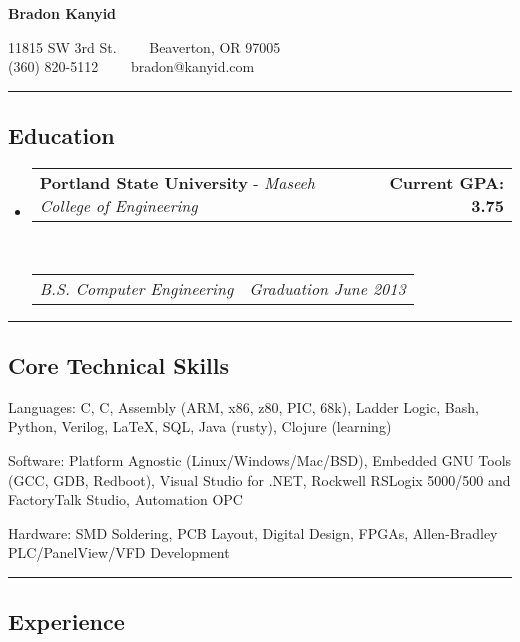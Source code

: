 \documentclass[10pt,letterpaper]{article}
\makeatletter
\newenvironment{indentsection}[1]%
{\begin{list}{}%
	{\setlength{\leftmargin}{#1}}%
	\item[]%
}
{\end{list}}
\newcommand{\headerrow}[2]
{\begin{tabular*}{\linewidth}{l@{\extracolsep{\fill}}r}
	#1 &
	#2 \\
\end{tabular*}}
\newcommand{\CPP}
{C\nolinebreak[4]\hspace{-.05em}\raisebox{.22ex}{\footnotesize\bf ++}}
\makeatother
\begin{document}
\begin{center}
{\LARGE \textbf{Bradon Kanyid}}

11815 SW 3rd St.\ \ \textbullet
\ \ Beaverton, OR 97005
\\
(360) 820-5112\ \ \textbullet
\ \ bradon@kanyid.com
\end{center}


\hrule
\vspace{-0.4em}
\subsection*{Education}

\begin{itemize}
	\parskip=0.1em

	\item 
	\headerrow
  {\textbf{Portland State University} - \emph{Maseeh College of Engineering}}
		{\textbf{Current GPA: 3.75}}
	\\
	\headerrow
		{\emph{B.S. Computer Engineering}}
		{\emph{Graduation June 2013}}
\end{itemize}

\hrule
\vspace{-0.4em}
\subsection*{Core Technical Skills}

\begin{indentsection}{\parindent}
\begin{description*}
	\item[Languages:]
    C, \CPP, Assembly (ARM, x86, z80, PIC, 68k), Ladder Logic, Bash, Python, Verilog, \LaTeX, SQL, Java (rusty), Clojure (learning)
	\item[Software:]
    Platform Agnostic (Linux/Windows/Mac/BSD), Embedded GNU Tools (GCC, GDB, Redboot), Visual Studio for .NET, Rockwell RSLogix 5000/500 and FactoryTalk Studio, Automation OPC 
	\item[Hardware:]
    SMD Soldering, PCB Layout, Digital Design, FPGAs, Allen-Bradley PLC/PanelView/VFD Development 

\end{description*}
\end{indentsection}

\hrule
\vspace{-0.4em}
\subsection*{Experience}
\end{document}
